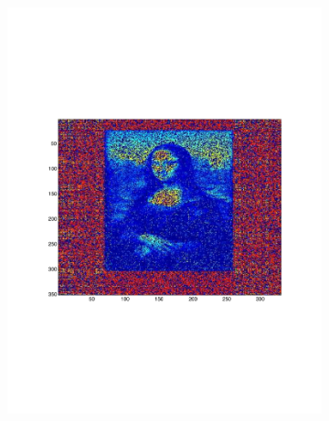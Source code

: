 \begin{figure}[h!tbp]
\begin{subfigure}[c]{0.3\textwidth}
        \includegraphics[width=\textwidth]{img/p5_m1_lam3.pdf}
    \end{subfigure}
    \begin{subfigure}[d]{0.3\textwidth}

\end{subfigure}
\end{figure}
